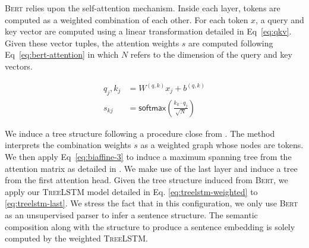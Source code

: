 \textsc{Bert} relies upon the self-attention mechanism. Inside each layer, tokens are computed as a weighted combination of each other. For each token $x$, a query and key vector are computed using a linear transformation detailed in Eq~\ref{eq:qkv}. Given these vector tuples, the attention weights $s$ are computed following Eq~\ref{eq:bert-attention} in which $N$ refers to the dimension of the query and key vectors.

\begin{align}
    q_j, k_j &= W^{(q, k)} x_j + b^{(q, k)} \label{eq:qkv}\\
    s_{kj} &= \mathsf{softmax}\left(\frac{k_{k} \cdot q_{j}}{\sqrt{N}}\right) \label{eq:bert-attention}
\end{align}

We induce a tree structure following a procedure close from \textcite{ravishankar_21}. The method interprets the combination weights $s$ as a weighted graph whose nodes are tokens. We then apply Eq~\ref{eq:biaffine-3} to induce a maximum spanning tree from the attention matrix as detailed in . We make use of the last layer and induce a tree from the first attention head. Given the tree structure induced from \textsc{Bert}, we apply our \textsc{TreeLSTM} model detailed in Eq. \ref{eq:treelstm-weighted} to \ref{eq:treelstm-last}. We stress the fact that in this configuration, we only use \textsc{Bert} as an unsupervised parser to infer a sentence structure. The semantic composition along with the structure to produce a sentence embedding is solely computed by the weighted \textsc{TreeLSTM}.


